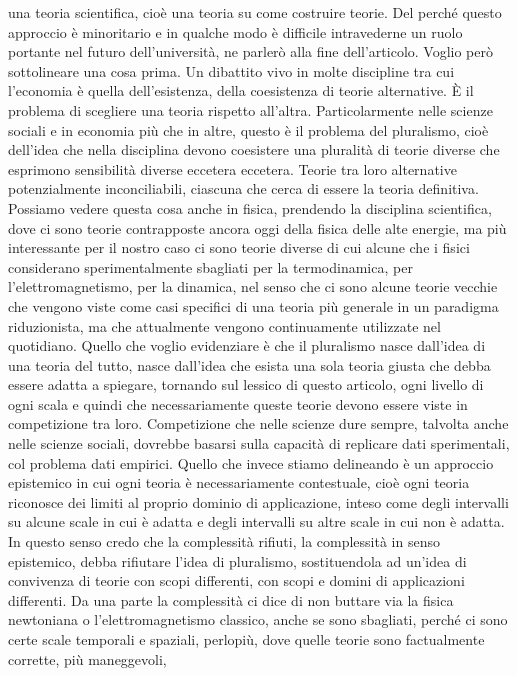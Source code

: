 \documentclass[a4paper, headings=standardclasses]{scrartcl}
\begin{document}
una teoria scientifica, cioè una teoria su come costruire teorie.
Del perché questo approccio è minoritario e in qualche modo è difficile intravederne
un ruolo portante nel futuro dell'università, ne parlerò alla fine dell'articolo. Voglio però
sottolineare una cosa prima. Un dibattito vivo in molte discipline tra cui l'economia è quella
dell'esistenza, della coesistenza di teorie alternative. È il problema di scegliere una teoria rispetto
all'altra. Particolarmente nelle scienze sociali e in economia più che in altre, questo è il problema del pluralismo,
cioè dell'idea che nella disciplina devono coesistere una pluralità di teorie diverse che
esprimono sensibilità diverse eccetera eccetera. Teorie tra loro alternative potenzialmente
inconciliabili, ciascuna che cerca di essere la teoria definitiva. Possiamo vedere questa cosa
anche in fisica, prendendo la disciplina scientifica, dove ci sono teorie contrapposte ancora oggi
della fisica delle alte energie, ma più interessante per il nostro caso ci sono teorie diverse di
cui alcune che i fisici considerano sperimentalmente sbagliati per la termodinamica, per l'elettromagnetismo,
per la dinamica, nel senso che ci sono alcune teorie vecchie che vengono viste come casi specifici
di una teoria più generale in un paradigma riduzionista, ma che attualmente vengono
continuamente utilizzate nel quotidiano. Quello che voglio evidenziare è che il pluralismo nasce
dall'idea di una teoria del tutto, nasce dall'idea che esista una sola teoria giusta che debba essere
adatta a spiegare, tornando sul lessico di questo articolo, ogni livello di ogni scala e quindi che
necessariamente queste teorie devono essere viste in competizione tra loro. Competizione che nelle scienze dure
sempre, talvolta anche nelle scienze sociali, dovrebbe basarsi sulla capacità di replicare
dati sperimentali, col problema dati empirici. Quello che invece stiamo delineando è un approccio epistemico
in cui ogni teoria è necessariamente contestuale, cioè ogni teoria riconosce dei limiti al proprio dominio di applicazione,
inteso come degli intervalli su alcune scale in cui è adatta e degli intervalli su altre scale in cui non è adatta.
In questo senso credo che la complessità rifiuti, la complessità in senso epistemico, debba rifiutare l'idea di pluralismo,
sostituendola ad un'idea di convivenza di teorie con scopi differenti, con scopi e domini di applicazioni differenti.
Da una parte la complessità ci dice di non buttare via la fisica newtoniana o l'elettromagnetismo classico, anche se sono sbagliati,
perché ci sono certe scale temporali e spaziali, perlopiù, dove quelle teorie sono factualmente corrette, più maneggevoli,
\end{document}
